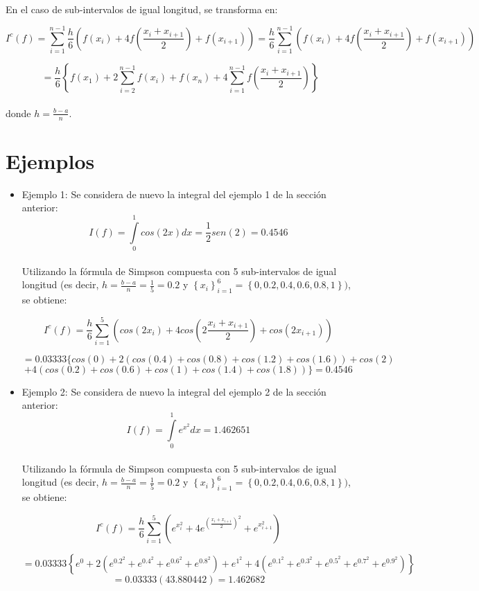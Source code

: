 \documentclass[report,oneside]{revcoles}
\begin{document}
~\\En el caso de sub-intervalos de igual longitud, se transforma en:

$$I^{c}(f)=\sum\limits_{i=1}^{n-1}\frac{h}{6}\left(f(x_{i})+4f\left(\frac{x_{i}+x_{i+1}}{2}\right)+f(x_{i+1})\right)=\frac{h}{6}\sum\limits_{i=1}^{n-1}\left(f(x_{i})+4f\left(\frac{x_{i}+x_{i+1}}{2}\right)+f(x_{i+1})\right)$$

$$=\frac{h}{6}\left\lbrace f(x_{1})+2\sum\limits_{i=2}^{n-1}f(x_{i})+f(x_{n})+4\sum\limits_{i=1}^{n-1}f\left(\frac{x_{i}+x_{i+1}}{2}\right)\right\rbrace$$
~\\donde $h=\frac{b-a}{n}$.
\section{Ejemplos}
\begin{itemize}
\item[]Ejemplo 1: Se considera de nuevo la integral del ejemplo 1 de la sección anterior:
$$I(f)=\int\limits_{0}^{1}cos(2x)dx=\frac{1}{2}sen(2)=0.4546$$
~\\Utilizando la fórmula de Simpson compuesta con 5 sub-intervalos de igual longitud (es decir, $h=\frac{b-a}{n}=\frac{1}{5}=0.2$ y $\left\lbrace x_{i} \right\rbrace ^{6}_{i=1}=\left\lbrace 0,0.2,0.4,0.6,0.8,1 \right\rbrace )$, se obtiene:

$$I^{c}(f)=\frac{h}{6}\sum\limits_{i=1}^{5} \left( cos(2x_{i})+4cos \left( 2\frac{x_{i}+x_{i+1}}{2} \right)+cos(2x_{i+1}) \right)$$

$$=0.03333\{ cos(0)+2(cos(0.4)+cos(0.8)+cos(1.2)+cos(1.6))+cos(2)$$
$$+4(cos(0.2)+cos(0.6)+cos(1)+cos(1.4)+cos(1.8))\}=0.4546$$

\item[]Ejemplo 2: Se considera de nuevo la integral del ejemplo 2 de la sección anterior:
$$I(f)=\int\limits_{0}^{1}e^{x^2}dx=1.462651$$ 
~\\Utilizando la fórmula de Simpson compuesta con 5 sub-intervalos de igual longitud (es decir, $h=\frac{b-a}{n}=\frac{1}{5}=0.2$ y $\left\lbrace x_{i} \right\rbrace ^{6}_{i=1}=\left\lbrace 0,0.2,0.4,0.6,0.8,1 \right\rbrace )$, se obtiene:

$$I^{c}(f)=\frac{h}{6}\sum\limits_{i=1}^{5} \left( e^{x^{2}_{i}}+4 e^{\left(\frac{x_{i}+x_{i+1}}{2} \right)^2}+e^{x_{i+1}^2} \right)$$

$$=0.03333\left\lbrace e^{0}+2(e^{0.2^2}+e^{0.4^2}+e^{0.6^2}+e^{0.8^2})+e^{1^2}+4(e^{0.1^2}+e^{0.3^2}+e^{0.5^2}+e^{0.7^2}+e^{0.9^2})\right\rbrace$$
$$=0.03333(43.880442)=1.462682$$
\end{itemize}
\end{document}
